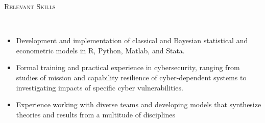 \documentclass[11pt]{article}
\newenvironment{changemargin}[2]{%
  \begin{list}{}{%
    \setlength{\topsep}{0pt}%
    \setlength{\leftmargin}{#1}%
    \setlength{\rightmargin}{#2}%
    \setlength{\listparindent}{\parindent}%
    \setlength{\itemindent}{\parindent}%
    \setlength{\parsep}{\parskip}%
  }%
  \item[]}{\end{list}
}
\newcommand{\lineover}{
	\begin{changemargin}{-0.05in}{-0.05in}
		\vspace*{-8pt}
		\hrulefill \\
		\vspace*{-2pt}
	\end{changemargin}
}
\newcommand{\header}[1]{
	\begin{changemargin}{-0.5in}{-0.5in}
		\scshape{#1}\\
  	\lineover
	\end{changemargin}
}
\newenvironment{body} {
	\vspace*{-16pt}
	\begin{changemargin}{-0.25in}{-0.5in}
  }	
	{\end{changemargin}
}
\begin{document}
%
%	
%	

\header{Relevant Skills}

\begin{body}
	\vspace{14pt}
	\begin{itemize}
		\item Development and implementation of classical and Bayesian statistical and econometric models in R, Python, Matlab, and Stata.
		\item Formal training and practical experience in cybersecurity, ranging from studies of mission and capability resilience of cyber-dependent systems to investigating impacts of specific cyber vulnerabilities.
		\item Experience working with diverse teams and developing models that synthesize theories and results from a multitude of disciplines
	\end{itemize}
\end{body}
\end{document}
